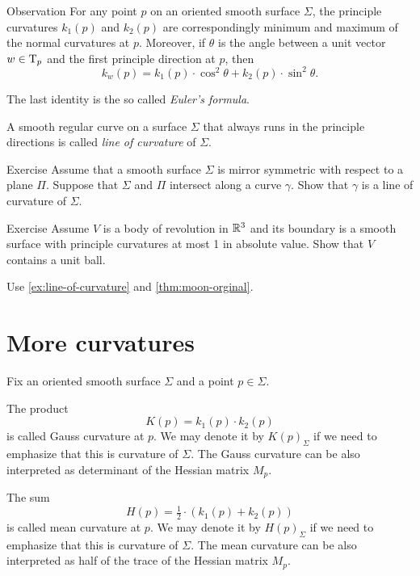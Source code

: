 \begin{thm}{Observation}\label{obs:k1-k2}
For any point $p$ on an oriented smooth surface $\Sigma$,
the principle curvatures $k_1(p)$ and $k_2(p)$ are correspondingly minimum and maximum of the normal curvatures at $p$.
Moreover, if $\theta$ is the angle between a unit vector $w\in\mathrm{T}_p$ and the first principle direction at $p$, then 
\[k_w(p)=k_1(p)\cdot\cos^2\theta+k_2(p)\cdot\sin^2\theta.\]

\end{thm}

The last identity is the so called \emph{Euler's formula}.

A smooth regular curve on a surface $\Sigma$ that always runs in the principle directions is called \emph{line of curvature} of $\Sigma$.  

\begin{thm}{Exercise}\label{ex:line-of-curvature}
Assume that a smooth surface $\Sigma$ is mirror symmetric with respect to  a plane $\Pi$.
Suppose that $\Sigma$ and $\Pi$ intersect along a curve $\gamma$.
Show that $\gamma$ is a line of curvature of $\Sigma$.
\end{thm}

\begin{thm}{Exercise}\label{ex:moon-revolution}
Assume $V$ is a body of revolution in $\mathbb{R}^3$ and its boundary is a smooth surface with principle curvatures at most 1 in absolute value.
Show that $V$ contains a unit ball.
\end{thm}

 Use \ref{ex:line-of-curvature} and \ref{thm:moon-orginal}.

\section*{More curvatures}

Fix an oriented smooth surface $\Sigma$ and a point $p\in\Sigma$.

The product 
\[K(p)=k_1(p)\cdot k_2(p)\]
is called Gauss curvature at $p$.
We may denote it by $K(p)_\Sigma$ if we need to emphasize that this is curvature of $\Sigma$.
The Gauss curvature can be also interpreted as determinant of the Hessian matrix $M_p$.

The sum 
\[H(p)=\tfrac12\cdot(k_1(p)+ k_2(p))\] %
is called mean curvature at $p$.
We may denote it by $H(p)_\Sigma$ if we need to emphasize that this is curvature of $\Sigma$.
The mean curvature can be also interpreted as half of the trace of the Hessian matrix $M_p$. %

